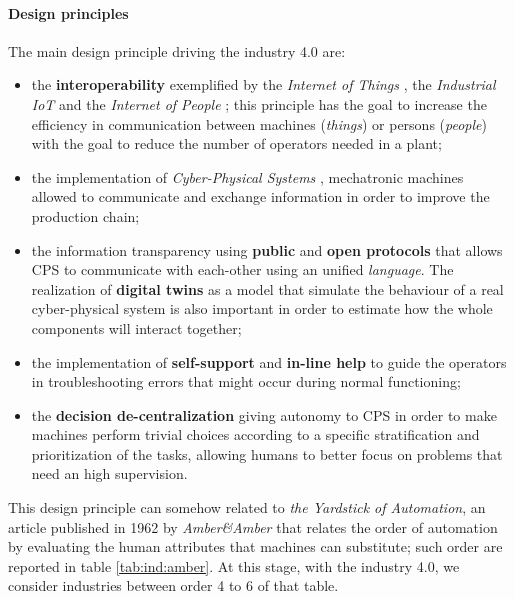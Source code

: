 	\paragraph{Design principles} The main design principle driving the industry 4.0 are:
	\begin{itemize}
		\item the \textbf{interoperability} exemplified by the \textit{Internet of Things} , the \textit{Industrial IoT}  and the \textit{Internet of People} ; this principle has the goal to increase the efficiency in communication between machines (\textit{things}) or persons (\textit{people}) with the goal to reduce the number of operators needed in a plant;
		\item the implementation of \textit{Cyber-Physical Systems} , mechatronic machines allowed to communicate and exchange information in order to improve the production chain;
		\item the information transparency using \textbf{public} and \textbf{open protocols} that allows CPS to communicate with each-other using an unified \textit{language}. The realization of \textbf{digital twins} as a model that simulate the behaviour of a real cyber-physical system is also important in order to estimate how the whole components will interact together;
		\item the implementation of \textbf{self-support} and \textbf{in-line help} to guide the operators in troubleshooting errors that might occur during normal functioning;
		\item the \textbf{decision de-centralization} giving autonomy to CPS in order to make machines perform trivial choices according to a specific stratification and prioritization of the tasks, allowing humans to better focus on problems that need an high supervision.
	\end{itemize}
	
	This design principle can somehow related to \textit{the Yardstick of Automation}, an article published in 1962 by \textit{Amber\&Amber} that relates the order of automation by evaluating the human attributes that machines can substitute; such order are reported in table \ref{tab:ind:amber}. At this stage, with the industry 4.0, we consider industries between order 4 to 6 of that table.
	
